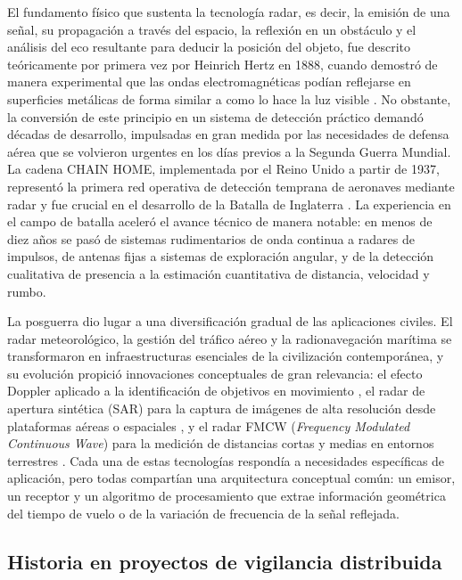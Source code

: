 El fundamento físico que sustenta la tecnología radar, es decir, la emisión de una señal, su propagación a través del espacio, la reflexión en un obstáculo y el análisis del eco resultante para deducir la posición del objeto, fue descrito teóricamente por primera vez por Heinrich Hertz en 1888, cuando demostró de manera experimental que las ondas electromagnéticas podían reflejarse en superficies metálicas de forma similar a como lo hace la luz visible \cite{5}. No obstante, la conversión de este principio en un sistema de detección práctico demandó décadas de desarrollo, impulsadas en gran medida por las necesidades de defensa aérea que se volvieron urgentes en los días previos a la Segunda Guerra Mundial. La cadena CHAIN HOME, implementada por el Reino Unido a partir de 1937, representó la primera red operativa de detección temprana de aeronaves mediante radar y fue crucial en el desarrollo de la Batalla de Inglaterra \cite{5,6}. La experiencia en el campo de batalla aceleró el avance técnico de manera notable: en menos de diez años se pasó de sistemas rudimentarios de onda continua a radares de impulsos, de antenas fijas a sistemas de exploración angular, y de la detección cualitativa de presencia a la estimación cuantitativa de distancia, velocidad y rumbo.

La posguerra dio lugar a una diversificación gradual de las aplicaciones civiles. El radar meteorológico, la gestión del tráfico aéreo y la radionavegación marítima se transformaron en infraestructuras esenciales de la civilización contemporánea, y su evolución propició innovaciones conceptuales de gran relevancia: el efecto Doppler aplicado a la identificación de objetivos en movimiento \cite{6}, el radar de apertura sintética (SAR) para la captura de imágenes de alta resolución desde plataformas aéreas o espaciales \cite{7}, y el radar FMCW (\textit{Frequency Modulated Continuous Wave}) para la medición de distancias cortas y medias en entornos terrestres \cite{8}. Cada una de estas tecnologías respondía a necesidades específicas de aplicación, pero todas compartían una arquitectura conceptual común: un emisor, un receptor y un algoritmo de procesamiento que extrae información geométrica del tiempo de vuelo o de la variación de frecuencia de la señal reflejada.

\subsection{Historia en proyectos de vigilancia distribuida}

